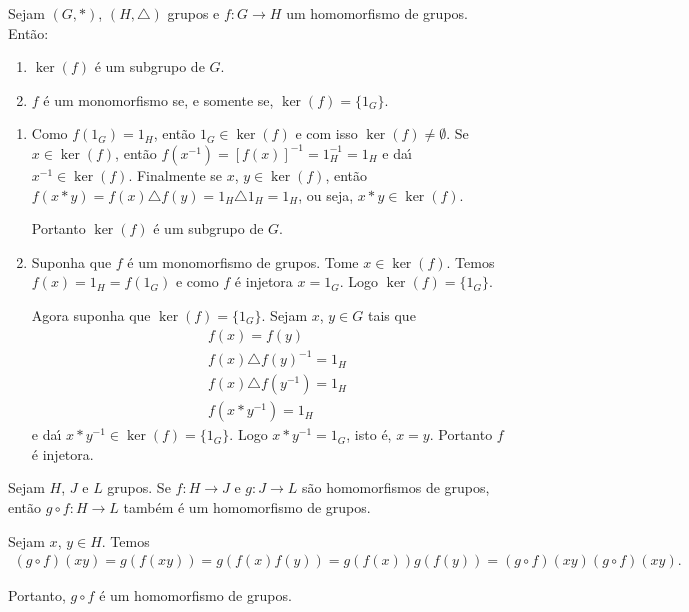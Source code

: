 \begin{proposicao}
	Sejam $(G, *)$, $(H, \triangle)$ grupos e $f : G \to H$ um homomorfismo de grupos. Ent\~ao:
	\begin{enumerate}[label={\roman*})]
		\item $\ker(f)$ \'e um subgrupo de $G$.
		\item $f$ \'e um monomorfismo se, e somente se, $\ker(f) = \{1_G\}$.
	\end{enumerate}
\end{proposicao}
\begin{prova}
	\begin{enumerate}[label={\roman*})]
		\item Como $f(1_G) = 1_H$, ent\~ao $1_G \in \ker(f)$ e com isso $\ker(f) \ne \emptyset$. Se $x \in \ker(f)$, ent\~ao $f(x^{-1}) = [f(x)]^{-1} = 1_H^{-1} = 1_H$ e da{\'\i} $x^{-1} \in \ker(f)$. Finalmente se $x$, $y \in \ker(f)$, ent\~ao $f(x*y) = f(x)\triangle f(y) = 1_H \triangle 1_H = 1_H$, ou seja, $x * y \in \ker(f)$.

		Portanto $\ker(f)$ \'e um subgrupo de $G$.

		\item Suponha que $f$ \'e um monomorfismo de grupos. Tome $x \in \ker(f)$. Temos $f(x) = 1_H = f(1_G)$ e como $f$ \'e injetora $x = 1_G$. Logo $\ker(f) = \{1_G\}$.

		Agora suponha que $\ker(f) = \{1_G\}$. Sejam $x$, $y \in G$ tais que
		\begin{align*}
			&f(x) = f(y)\\
			&f(x)\triangle f(y)^{-1} = 1_H\\
			&f(x)\triangle f(y^{-1}) = 1_H\\
			&f(x * y^{-1}) = 1_H
		\end{align*}
		e da{\'\i} $x*y^{-1} \in \ker(f) = \{1_G\}$. Logo $x*y^{-1} = 1_G$, isto \'e, $x = y$. Portanto $f$ \'e injetora.
	\end{enumerate}
\end{prova}

\begin{proposicao}
    Sejam $H$, $J$ e $L$ grupos. Se $f : H \to J$ e $g : J \to L$ s\~ao homomorfismos de grupos, ent\~ao $g \circ f : H \to L$ tamb\'em \'e um homomorfismo de grupos.
\end{proposicao}
\begin{prova}
	Sejam $x$, $y \in H$. Temos
	\begin{align*}
		(g \circ f)(xy) = g(f(xy)) = g(f(x)f(y)) = g(f(x))g(f(y)) = (g \circ f)(xy)(g \circ f)(xy).
	\end{align*}

	Portanto, $g \circ f$ \'e um homomorfismo de grupos.
\end{prova}


